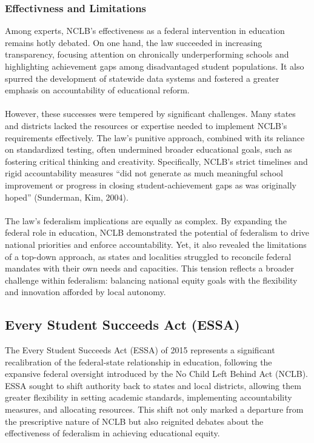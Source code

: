 \documentclass[11pt]{extarticle}
\begin{document}
\subsubsection{Effectivness and Limitations}
Among experts, NCLB’s effectiveness as a federal intervention in education remains hotly debated. On one hand, the law succeeded in increasing transparency, focusing attention on chronically underperforming schools and highlighting achievement gaps among disadvantaged student populations. It also spurred the development of statewide data systems and fostered a greater emphasis on accountability of educational reform.\\
\\
However, these successes were tempered by significant challenges. Many states and districts lacked the resources or expertise needed to implement NCLB’s requirements effectively. The law’s punitive approach, combined with its reliance on standardized testing, often undermined broader educational goals, such as fostering critical thinking and creativity. Specifically, NCLB’s strict timelines and rigid accountability measures “did not generate as much meaningful school improvement or progress in closing student-achievement gaps as was originally hoped” (Sunderman, Kim, 2004).\\
\\
The law’s federalism implications are equally as complex. By expanding the federal role in education, NCLB demonstrated the potential of federalism to drive national priorities and enforce accountability. Yet, it also revealed the limitations of a top-down approach, as states and localities struggled to reconcile federal mandates with their own needs and capacities. This tension reflects a broader challenge within federalism: balancing national equity goals with the flexibility and innovation afforded by local autonomy.





\subsection{Every Student Succeeds Act (ESSA)}
The Every Student Succeeds Act (ESSA) of 2015 represents a significant recalibration of the federal-state relationship in education, following the expansive federal oversight introduced by the No Child Left Behind Act (NCLB). ESSA sought to shift authority back to states and local districts, allowing them greater flexibility in setting academic standards, implementing accountability measures, and allocating resources. This shift not only marked a departure from the prescriptive nature of NCLB but also reignited debates about the effectiveness of federalism in achieving educational equity.
\end{document}
